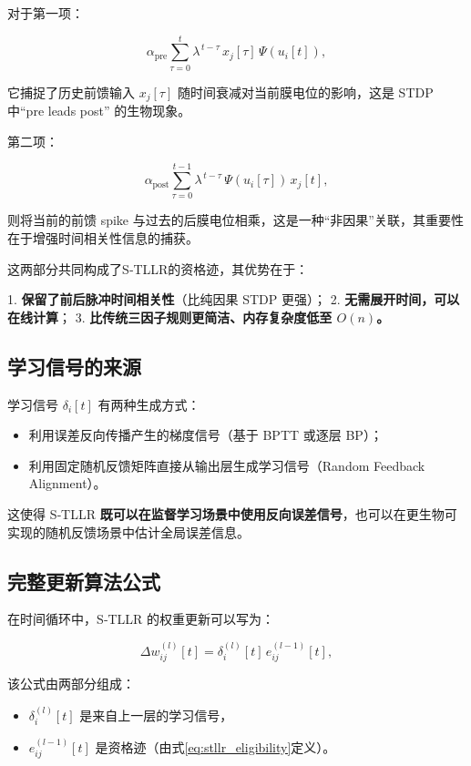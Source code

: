 \documentclass[journal,12pt,onecolumn]{IEEEtran}
\begin{document}
对于第一项：

\begin{equation}
\alpha_{\text{pre}} \sum_{\tau=0}^{t} \lambda^{\,t-\tau} \, x_j[\tau] \, \Psi(u_i[t]),
\end{equation}

它捕捉了历史前馈输入 $x_j[\tau]$ 随时间衰减对当前膜电位的影响，这是 STDP 中“pre leads post” 的生物现象。

第二项：

\begin{equation}
\alpha_{\text{post}} \sum_{\tau=0}^{t-1} \lambda^{\,t-\tau} \, \Psi(u_i[\tau]) \, x_j[t],
\end{equation}

则将当前的前馈 spike 与过去的后膜电位相乘，这是一种“非因果”关联，其重要性在于增强时间相关性信息的捕获。

这两部分共同构成了S‑TLLR的资格迹，其优势在于：

1. \textbf{保留了前后脉冲时间相关性}（比纯因果 STDP 更强）；  
2. \textbf{无需展开时间，可以在线计算}；  
3. \textbf{比传统三因子规则更简洁、内存复杂度低至 $O(n)$。} 

\subsection{学习信号的来源}

学习信号 $\delta_i[t]$ 有两种生成方式：

\begin{itemize}
    \item 利用误差反向传播产生的梯度信号（基于 BPTT 或逐层 BP）；
    \item 利用固定随机反馈矩阵直接从输出层生成学习信号（Random Feedback Alignment）。
\end{itemize}

这使得 S‑TLLR \textbf{既可以在监督学习场景中使用反向误差信号}，也可以在更生物可实现的随机反馈场景中估计全局误差信息。

\subsection{完整更新算法公式}

在时间循环中，S‑TLLR 的权重更新可以写为：

\begin{equation}
\Delta w_{ij}^{(l)}[t] = \delta_i^{(l)}[t] \, e_{ij}^{(l-1)}[t],
\end{equation}

该公式由两部分组成：
\begin{itemize}
    \item $\delta_i^{(l)}[t]$ 是来自上一层的学习信号，
    \item $e_{ij}^{(l-1)}[t]$ 是资格迹（由式\eqref{eq:stllr_eligibility}定义）。
\end{itemize}
\end{document}

